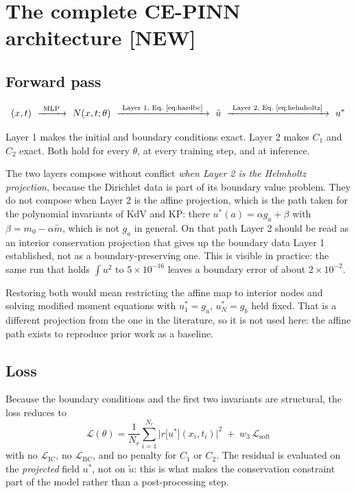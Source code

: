 \documentclass[11pt,a4paper]{article}
\theoremstyle{remark}
\newcommand{\ut}{\tilde{u}}
\newcommand{\us}{u^{*}}
\begin{document}
\section{The complete CE-PINN architecture \textbf{[NEW]}}

\subsection{Forward pass}

\begin{equation}
(x,t)
\ \xrightarrow{\ \text{MLP}\ }\ N(x,t;\theta)
\ \xrightarrow{\ \text{Layer 1, Eq.~\eqref{eq:hardbc}}\ }\ \ut
\ \xrightarrow{\ \text{Layer 2, Eq.~\eqref{eq:helmholtz}}\ }\ \us
\end{equation}

Layer 1 makes the initial and boundary conditions exact. Layer 2 makes $C_1$ and
$C_2$ exact. Both hold for every $\theta$, at every training step, and at
inference.

The two layers compose without conflict \emph{when Layer 2 is the Helmholtz
projection}, because the Dirichlet data is part of its boundary value problem.
They do not compose when Layer 2 is the affine projection, which is the path
taken for the polynomial invariants of KdV and KP: there
$\us(a) = \alpha g_a + \beta$ with $\beta = m_0 - \alpha\tilde m$, which is not
$g_a$ in general. On that path Layer 2 should be read as an interior
conservation projection that gives up the boundary data Layer 1 established,
not as a boundary-preserving one. This is visible in practice: the same run
that holds $\int u^2$ to $5\times10^{-16}$ leaves a boundary error of about
$2\times10^{-2}$.

Restoring both would mean restricting the affine map to interior nodes and
solving modified moment equations with $\us_1 = g_a$, $\us_N = g_b$ held fixed.
That is a different projection from the one in the literature, so it is not
used here: the affine path exists to reproduce prior work as a baseline.

\subsection{Loss}

Because the boundary conditions and the first two invariants are structural, the
loss reduces to
\begin{equation}
\boxed{\
\mathcal{L}(\theta)
= \frac{1}{N_r}\sum_{i=1}^{N_r}\Big|r\big[\us\big](x_i,t_i)\Big|^2
\;+\; w_3\,\mathcal{L}_{\text{soft}} \ }
\end{equation}
with no $\mathcal{L}_{\text{IC}}$, no $\mathcal{L}_{\text{BC}}$, and no penalty
for $C_1$ or $C_2$. The residual is evaluated on the \emph{projected} field
$\us$, not on $\ut$: this is what makes the conservation constraint part of the
model rather than a post-processing step.
\end{document}
